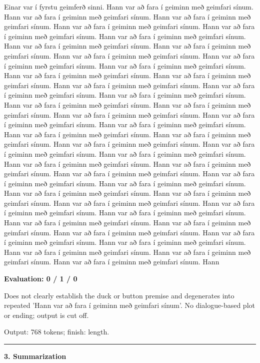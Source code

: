 \documentclass[10pt]{article}
\begin{document}
{\begin{minipage}{\textwidth}
Einar var í fyrstu geimferð sinni. Hann var að fara í geiminn með geimfari sínum. Hann var að fara í geiminn með geimfari sínum. Hann var að fara í geiminn með geimfari sínum. Hann var að fara í geiminn með geimfari sínum. Hann var að fara í geiminn með geimfari sínum. Hann var að fara í geiminn með geimfari sínum. Hann var að fara í geiminn með geimfari sínum. Hann var að fara í geiminn með geimfari sínum. Hann var að fara í geiminn með geimfari sínum. Hann var að fara í geiminn með geimfari sínum. Hann var að fara í geiminn með geimfari sínum. Hann var að fara í geiminn með geimfari sínum. Hann var að fara í geiminn með geimfari sínum. Hann var að fara í geiminn með geimfari sínum. Hann var að fara í geiminn með geimfari sínum. Hann var að fara í geiminn með geimfari sínum. Hann var að fara í geiminn með geimfari sínum. Hann var að fara í geiminn með geimfari sínum. Hann var að fara í geiminn með geimfari sínum. Hann var að fara í geiminn með geimfari sínum. Hann var að fara í geiminn með geimfari sínum. Hann var að fara í geiminn með geimfari sínum. Hann var að fara í geiminn með geimfari sínum. Hann var að fara í geiminn með geimfari sínum. Hann var að fara í geiminn með geimfari sínum. Hann var að fara í geiminn með geimfari sínum. Hann var að fara í geiminn með geimfari sínum. Hann var að fara í geiminn með geimfari sínum. Hann var að fara í geiminn með geimfari sínum. Hann var að fara í geiminn með geimfari sínum. Hann var að fara í geiminn með geimfari sínum. Hann var að fara í geiminn með geimfari sínum. Hann var að fara í geiminn með geimfari sínum. Hann var að fara í geiminn með geimfari sínum. Hann var að fara í geiminn með geimfari sínum. Hann var að fara í geiminn með geimfari sínum. Hann var að fara í geiminn með geimfari sínum. Hann var að fara í geiminn með geimfari sínum. Hann var að fara í geiminn með geimfari sínum. Hann var að fara í geiminn með geimfari sínum. Hann var að fara í geiminn með geimfari sínum. Hann var að fara í geiminn með geimfari sínum. Hann var að fara í geiminn með geimfari sínum. Hann var að fara í geiminn með geimfari sínum. Hann\par\smallskip
\textbf{Evaluation: 0 / 1 / 0}\par Does not clearly establish the duck or button premise and degenerates into repeated 'Hann var að fara í geiminn með geimfari sínum'. No dialogue-based plot or ending; output is cut off.
\par {\color{gray} Output: 768 tokens; finish: length.}\par
\medskip\hrule\smallskip
{\bfseries 3. Summarization}\par\smallskip

\end{minipage}}
\end{document}

